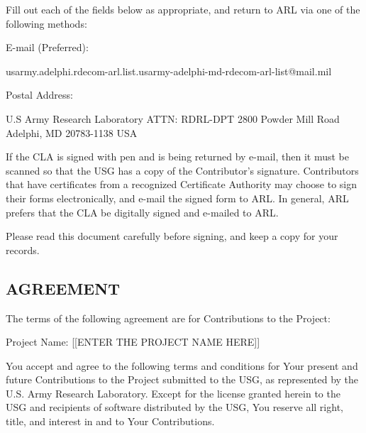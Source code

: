 Fill out each of the fields below as appropriate, and return to ARL via
one of the following methods:

E-mail (Preferred):

usarmy.adelphi.rdecom-arl.list.usarmy-adelphi-md-rdecom-arl-list@mail.mil

Postal Address:

U.S Army Research Laboratory ATTN: RDRL-DPT 2800 Powder Mill Road
Adelphi, MD 20783-1138 USA

If the CLA is signed with pen and is being returned by e-mail, then it
must be scanned so that the USG has a copy of the Contributor's
signature. Contributors that have certificates from a recognized
Certificate Authority may choose to sign their forms electronically, and
e-mail the signed form to ARL. In general, ARL prefers that the CLA be
digitally signed and e-mailed to ARL.

Please read this document carefully before signing, and keep a copy for
your records.

\subsection{AGREEMENT}\label{agreement}

The terms of the following agreement are for Contributions to the
Project:

Project Name: {[}{[}ENTER THE PROJECT NAME HERE{]}{]}

You accept and agree to the following terms and conditions for Your
present and future Contributions to the Project submitted to the USG, as
represented by the U.S. Army Research Laboratory. Except for the license
granted herein to the USG and recipients of software distributed by the
USG, You reserve all right, title, and interest in and to Your
Contributions.

